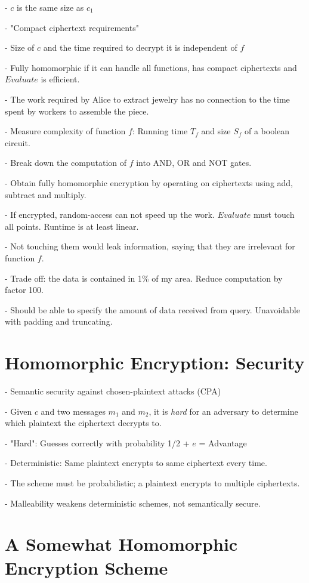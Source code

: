 \documentclass[10pt]{article}
\begin{document}
- $c$ is the same size as $c_1$

- "Compact ciphertext requirements"

- Size of $c$ and the time required to decrypt it is independent of $f$

- Fully homomorphic if it can handle all functions, has compact ciphertexts and $Evaluate$ is efficient.

- The work required by Alice to extract jewelry has no connection to the time spent by workers to assemble the piece.

- Measure complexity of function $f$: Running time $T_f$ and size $S_f$ of a boolean circuit. 

- Break down the computation of $f$ into AND, OR and NOT gates.

- Obtain fully homomorphic encryption by operating on ciphertexts using add, subtract and multiply.

- If encrypted, random-access can not speed up the work. $Evaluate$ must touch all points. Runtime is at least linear. 

- Not touching them would leak information, saying that they are irrelevant for function $f$.

- Trade off: the data is contained in 1\% of my area. Reduce computation by factor 100.

- Should be able to specify the amount of data received from query. Unavoidable with padding and truncating.



\section{Homomorphic Encryption: Security}

- Semantic security against chosen-plaintext attacks (CPA)

- Given $c$ and two messages $m_1$ and $m_2$, it is \emph{hard} for an adversary to determine which plaintext the ciphertext decrypts to.

- "Hard": Guesses correctly with probability 1/2 + $e$ = Advantage

- Deterministic: Same plaintext encrypts to same ciphertext every time.

- The scheme must be probabilistic; a plaintext encrypts to multiple ciphertexts.

- Malleability weakens deterministic schemes, not semantically secure.


\section{A Somewhat Homomorphic Encryption Scheme}
\end{document}
